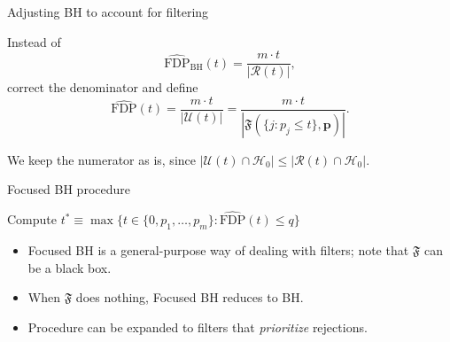 \documentclass{beamer}
\begin{document}
\begin{frame}{Adjusting BH to account for filtering}

Instead of 
\begin{equation*}
\widehat{\text{FDP}}_{\text{BH}}(t) = \frac{m \cdot t}{|\mathcal R(t)|},
\end{equation*}
correct the denominator and define
\begin{equation*}
\widehat{\text{FDP}}(t) = \frac{m \cdot t}{|\mathcal U(t)|} = \frac{m \cdot t}{|\mathfrak{F}(\{j: p_j \leq t\}, \bm p)|}.
\end{equation*}

We keep the numerator as is, since $|\mathcal U(t) \cap \mathcal H_0| \leq |\mathcal R(t) \cap \mathcal H_0|$.

	
\end{frame}

\begin{frame}{Focused BH procedure}
	\begin{center}
		\begin{minipage}{\linewidth}
			\large
			{			
				\setlength{\interspacetitleruled}{0pt}%
				\setlength{\algotitleheightrule}{0pt}%
				\begin{algorithm}[H]
					
					Compute $t^* \equiv \max\{t \in \{0, p_1, \dots, p_m\}: \widehat{\text{FDP}}(t) \leq q\}$\;		
				\end{algorithm}
			}
		\end{minipage}
	\end{center}
	\vspace{-0.1in}
	\begin{itemize}
		\item Focused BH is a general-purpose way of dealing with filters; note that $\mathfrak F$ can be a black box.
		\item When $\mathfrak F$ does nothing, Focused BH reduces to BH.
		\item Procedure can be expanded to filters that \textit{prioritize} rejections.
	\end{itemize}
\end{frame}
\end{document}
